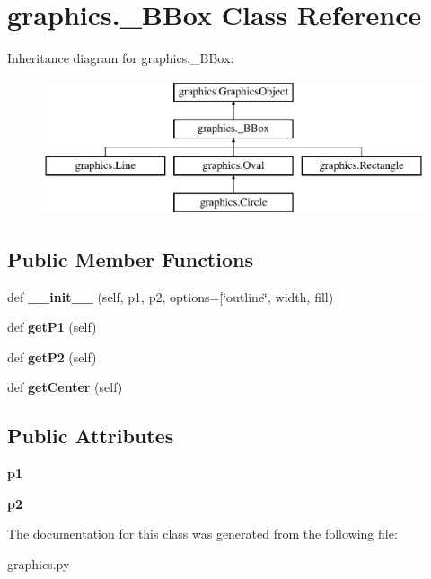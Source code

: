 \hypertarget{classgraphics_1_1___b_box}{}\section{graphics.\+\_\+\+B\+Box Class Reference}
\label{classgraphics_1_1___b_box}
Inheritance diagram for graphics.\+\_\+\+B\+Box\+:\begin{figure}[H]
\begin{center}
\leavevmode
\includegraphics[height=4.000000cm]{classgraphics_1_1___b_box}
\end{center}
\end{figure}
\subsection*{Public Member Functions}
\begin{DoxyCompactItemize}
\item 
\mbox{\label{classgraphics_1_1___b_box_a5738b02041db947dbbcb555ad6e6095a}} 
def {\bfseries \+\_\+\+\_\+init\+\_\+\+\_\+} (self, p1, p2, options=\mbox{[}\char`\"{}outline\char`\"{}, width, fill)
\item 
\mbox{\label{classgraphics_1_1___b_box_a2c3e73e8149fd0036055b94d28c3fbb4}} 
def {\bfseries get\+P1} (self)
\item 
\mbox{\label{classgraphics_1_1___b_box_aee9d6dc9fcb9eb74ee8281662d87f361}} 
def {\bfseries get\+P2} (self)
\item 
\mbox{\label{classgraphics_1_1___b_box_a7ffb5899c2626c1d882dae28b9eaf211}} 
def {\bfseries get\+Center} (self)
\end{DoxyCompactItemize}
\subsection*{Public Attributes}
\begin{DoxyCompactItemize}
\item 
\mbox{\label{classgraphics_1_1___b_box_a7d6ecb1b61e338a8f28e333c1e242b55}} 
{\bfseries p1}
\item 
\mbox{\label{classgraphics_1_1___b_box_ae54a3cc11dc9be1624b0fbef0bf22d70}} 
{\bfseries p2}
\end{DoxyCompactItemize}


The documentation for this class was generated from the following file\+:\begin{DoxyCompactItemize}
\item 
graphics.\+py\end{DoxyCompactItemize}
